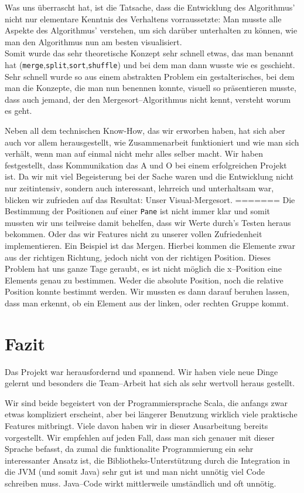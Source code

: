 Was uns überrascht hat, ist die Tatsache, dass die Entwicklung des Algorithmus' nicht nur elementare Kenntnis des Verhaltens vorraussetzte: Man musste alle Aspekte des Algorithmus' verstehen, um sich darüber unterhalten zu können, wie man den Algorithmus nun am besten visualisiert.\\
Somit wurde das sehr theoretische Konzept sehr schnell etwas, das man benannt hat (\texttt{merge},\texttt{split},\texttt{sort},\texttt{shuffle}) und bei dem man dann wusste wie es geschieht. Sehr schnell wurde so aus einem abstrakten Problem ein gestalterisches, bei dem man die Konzepte, die man nun benennen konnte, visuell so präsentieren musste, dass auch jemand, der den Mergesort--Algorithmus nicht kennt, versteht worum es geht.

Neben all dem technischen Know-How, das wir erworben haben, hat sich aber auch vor allem herausgestellt, wie Zusammenarbeit funktioniert und wie man sich verhält, wenn man auf einmal nicht mehr alles selber macht. Wir haben festgestellt, dass Kommunikation das A und O bei einem erfolgreichen Projekt ist. Da wir mit viel Begeisterung bei der Sache waren und die Entwicklung nicht nur zeitintensiv, sondern auch interessant, lehrreich und unterhaltsam war, blicken wir zufrieden auf das Resultat: Unser Visual-Mergesort.
=======
Die Bestimmung der Positionen auf einer \texttt{Pane} ist nicht immer klar und somit mussten wir uns teilweise damit behelfen, dass wir Werte durch's Testen heraus bekommen. Oder das wir Features nicht zu unserer vollen Zufriedenheit implementieren. Ein Beispiel ist das Mergen. Hierbei kommen die Elemente zwar aus der richtigen Richtung, jedoch nicht von der richtigen Position. Dieses Problem hat uns ganze Tage geraubt, es ist nicht möglich die x--Position eine Elements genau zu bestimmen. Weder die absolute Position, noch die relative Position konnte bestimmt werden. Wir mussten es dann darauf beruhen lassen, dass man erkennt, ob ein Element aus der linken, oder rechten Gruppe kommt.

\section{Fazit}\label{sec:fazit}
Das Projekt war herausfordernd und spannend. Wir haben viele neue Dinge gelernt und besonders die Team--Arbeit hat sich als sehr wertvoll heraus gestellt.

Wir sind beide begeistert von der Programmiersprache Scala, die anfangs zwar etwas kompliziert erscheint, aber bei längerer Benutzung wirklich viele praktische Features mitbringt. Viele davon haben wir in dieser Ausarbeitung bereits vorgestellt. Wir empfehlen auf jeden Fall, dass man sich genauer mit dieser Sprache befasst, da zumal die funktionalite Programmierung ein sehr interessanter Ansatz ist, die Bibliotheks-Unterstützung durch die Integration in die JVM (und somit Java) sehr gut ist und man nicht unnötig viel Code schreiben muss. Java--Code wirkt mittlerweile umständlich und oft unnötig.

